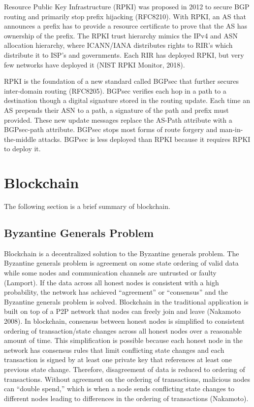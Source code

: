 \documentclass[letterpaper, 10 pt, conference]{ieeeconf}  %
\begin{document}
Resource Public Key Infrastructure (RPKI) was proposed in 2012 to secure BGP routing and primarily stop prefix hijacking (RFC8210). With RPKI, an AS that announces a prefix has to provide a resource certificate to prove that the AS has ownership of the prefix. The RPKI trust hierarchy mimics the IPv4 and ASN allocation hierarchy, where ICANN/IANA distributes rights to RIR’s which distribute it to ISP’s and governments. Each RIR has deployed RPKI, but very few networks have deployed it (NIST RPKI Monitor, 2018).

RPKI is the foundation of a new standard called BGPsec that further secures inter-domain routing (RFC8205). BGPsec verifies each hop in a path to a destination though a digital signature stored in the routing update. Each time an AS prepends their ASN to a path, a signature of the path and prefix must provided. These new update messages replace the AS-Path attribute with a BGPsec-path attribute. BGPsec stops most forms of route forgery and man-in-the-middle attacks. BGPsec is less deployed than RPKI because it requires RPKI to deploy it.

\section{Blockchain}
The following section is a brief summary of blockchain.

\subsection{Byzantine Generals Problem} 

Blockchain is a decentralized solution to the Byzantine generals problem. The Byzantine generals problem is agreement on some state ordering of valid data while some nodes and communication channels are untrusted or faulty (Lamport). If the data across all honest nodes is consistent with a high probability, the network has achieved “agreement” or “consensus” and the Byzantine generals problem is solved. Blockchain in the traditional application is built on top of a P2P network that nodes can freely join and leave (Nakamoto 2008). In blockchain, consensus between honest nodes is simplified to consistent ordering of transaction/state changes across all honest nodes over a reasonable amount of time. This simplification is possible because each honest node in the network has consensus rules that limit conflicting state changes and each transaction is signed by at least one private key that references at least one previous state change. Therefore, disagreement of data is reduced to ordering of transactions. Without agreement on the ordering of transactions, malicious nodes can “double spend,” which is when a node sends conflicting state changes to different nodes leading to differences in the
ordering of transactions (Nakamoto).
\end{document}
